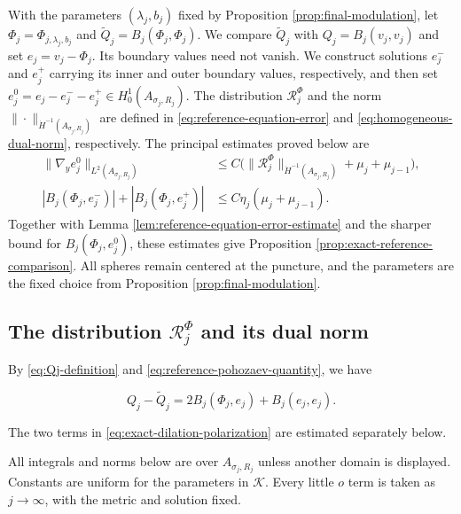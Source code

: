 \documentclass[11pt]{article}
\numberwithin{equation}{section}
\theoremstyle{remark}
\begin{document}
With the parameters \((\lambda_j,b_j)\) fixed by
Proposition  \ref{prop:final-modulation}, let
\(\Phi_j=\Phi_{j,\lambda_j,b_j}\) and
\(\widetilde Q_j=B_j(\Phi_j,\Phi_j)\). We compare \(\widetilde Q_j\) with
\(Q_j=B_j(v_j,v_j)\) and set \(e_j=v_j-\Phi_j\). Its boundary values need
not vanish.
We construct solutions \(e_j^-\) and \(e_j^+\) carrying its inner and outer
boundary values, respectively, and then set
\(e_j^0=e_j-e_j^--e_j^+\in H_0^1(A_{\sigma_j,R_j})\). 
The distribution \(\mathcal R_j^\Phi\) and the norm
\(\|\cdot\|_{\dot H^{-1}(A_{\sigma_j,R_j})}\) are defined in
\eqref{eq:reference-equation-error} and
\eqref{eq:homogeneous-dual-norm}, respectively.
 The principal
estimates proved below are
\[
 \begin{aligned}
 \|\nabla_y e_j^0\|_{L^2(A_{\sigma_j,R_j})}
 &\le C\bigl(
 \|\mathcal R_j^\Phi\|_{\dot H^{-1}(A_{\sigma_j,R_j})}
 +\mu_j+\mu_{j-1}\bigr),\\
 |B_j(\Phi_j,e_j^-)|+|B_j(\Phi_j,e_j^+)|
 &\le C\eta_j(\mu_j+\mu_{j-1}).
 \end{aligned}
\]
Together with Lemma  \ref{lem:reference-equation-error-estimate}
and the sharper bound for \(B_j(\Phi_j,e_j^0)\), these estimates give
Proposition  \ref{prop:exact-reference-comparison}.
 All spheres remain
centered at the puncture, and the parameters are the fixed choice from
Proposition  \ref{prop:final-modulation}.

\subsection{\texorpdfstring{The distribution
\(\mathcal R_j^\Phi\) and its dual norm}{The distribution
R_j^Φ and its dual norm}}

By  \eqref{eq:Qj-definition} and
\eqref{eq:reference-pohozaev-quantity}, we have
 
\begin{equation}\label{eq:exact-dilation-polarization}
 Q_j-\widetilde Q_j
 =2 B_j(\Phi_j,e_j)+ B_j(e_j,e_j).
\end{equation}

The two terms in \eqref{eq:exact-dilation-polarization} are estimated
separately below.

All integrals and norms below are over \(A_{\sigma_j,R_j}\) unless
another domain is displayed. Constants are uniform for the parameters
in \(\mathcal K\). Every little \(o\) term is taken as \(j\to\infty\),
with the metric and solution fixed.
\end{document}
